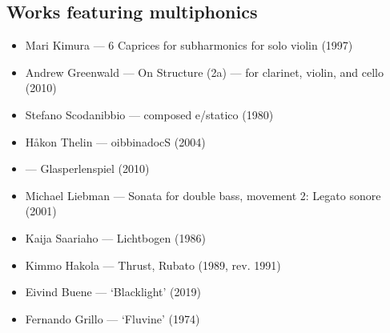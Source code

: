   



\subsection{Works featuring multiphonics}\label{sec:multiphonicsLiterature}

\begin{itemize}
    \item Mari Kimura --- 6 Caprices for subharmonics for solo violin (1997) 
    \item Andrew Greenwald --- On Structure (2a) --- for clarinet, violin, and cello (2010)
    \item Stefano Scodanibbio --- composed e/statico (1980)
    \item Håkon Thelin --- oibbinadocS (2004)
    \item --- Glasperlenspiel (2010)
    \item Michael Liebman --- Sonata for double bass, movement 2: Legato sonore (2001)
    \item Kaija Saariaho --- Lichtbogen (1986)
    \item Kimmo Hakola --- Thrust, Rubato (1989, rev. 1991) 
    \item Eivind Buene --- `Blacklight' (2019)
    \item Fernando Grillo --- `Fluvine' (1974)
\end{itemize}

